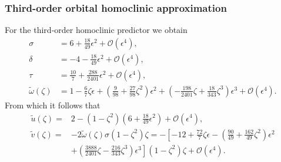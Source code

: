 \subsubsection{Third-order orbital homoclinic approximation}
\label{sec:third_order_homoclinic_approximation_LP}
For the third-order homoclinic predictor we obtain
\begin{align}
				\sigma &= 6 + \frac{18}{49}\epsilon^2 + \mathcal{O}(\epsilon^4),
				\nonumber \\
				\delta &=-4 - \frac{18}{49}\epsilon^2 + \mathcal{O}(\epsilon^4),
				\nonumber \\
				\label{eq:tau_orbital}
				\tau   &= \frac{10}{7} + \frac{288}{2401} \epsilon^2 +
								\mathcal{O}(\epsilon^4), \\
				\tilde \omega(\zeta) &= 1 - \frac{6}{7}\zeta \epsilon	+ 
				\left(\frac{9}{98} + \frac{27}{98}\zeta^2 \right) \epsilon^2 +
				\left( -\frac{198}{2401}\zeta + \frac{18}{343}\zeta^3 \right)\epsilon^3+
								\mathcal{O}(\epsilon^4). \nonumber
\end{align}
From which it follows that
\begin{align}
    \label{eq:third_order_uhat}
    \tilde {u}(\zeta) 
    ={}& 2 - \left(1-\zeta^2\right) \left(6 + \frac{18}{49}\epsilon^2 \right) 
        + \mathcal{O}(\epsilon^4), \\
    \label{eq:third_order_vhat}
	\tilde  v(\zeta) 
  ={}& -2 \tilde\omega(\zeta) \sigma (1-\zeta^2)\zeta
	= -\left[ -12 + \frac{72}{7} \zeta \epsilon
			 - \left( \frac{90}{49} + \frac{162 }{49} \zeta^2 \right)\epsilon^2
		 \right. \\
		 & + \left. \left( \frac{3888}{2401} \zeta -
     \frac{216}{343}\zeta^3 \right) \epsilon^3 \right]
     (1-\zeta^2) \zeta + \mathcal{O}(\epsilon^4) \nonumber.
\end{align}

